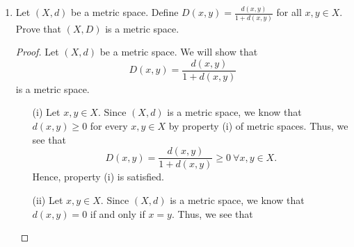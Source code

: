 \documentclass{article}
\begin{document}
\begin{enumerate}
\begin{proof}
\begin{enumerate}
\begin{align*}
                                        &= \max_{x \in [0,1]}| f(x) |  + \max_{x \in [0,1]} | g(x) | \tag{Problem 9-2) of hw1} \\
                                        &= \|f\|_{\infty } + \|g\|_{\infty }.
                \end{align*}
                Thus, the triangle inequality property is satisfied.
        \end{enumerate}
        Since all four properties have been satisfied, we can now conclude that \( \|\cdot\|_{\infty } \) is a norm on the vector space \( X = C[0,1] \). The corresponding metric is the function \( {d}_{\infty }: X \times X \to \R  \) defined by \( {d}_{\infty }(f,g) = \|f - g\|_{\infty } \).
    \end{proof}
    \begin{remark}
        We can appeal to the same methods in the remark of problem 12 to show the triangle inequality for the \( \|\cdot\|_{\infty } \). By definition of maximums, we see that  
        \( | f(x) | \leq \|f\|_{\infty } \) and \( | g(x) | \leq \|g\|_{\infty } \) for all \( x \in [0,1] \). Adding these two inequalities together and using the triangle inequality of the \( | \cdot |  \), we see that
        \[ | f(x) + g(x) |   \leq | f(x)  | + | g(x) |  \leq \|f\|_{\infty } + \|g\|_{\infty } \]
        which holds for all \( x \in [0,1] \). Thus, we see that the set 
        \[  | f(x) + g(x) | : x \in [0,1] \]
        is bounded above by \( \|f\|_{\infty } + \|g\|_{\infty }  \), and so we have
        \[ \|f +g\|_{\infty }  \max_{1 \leq i \leq n}| f(x) + g(x) | \leq \|f\|_{\infty } + \|g\|_{\infty }.  \]
    \end{remark}
\item Let \( (X,d) \) be a metric space. Define \( D(x,y) = \frac{ d(x,y) }{  1 + d(x,y) }  \) for all \( x,y \in X  \). Prove that \( (X,D) \) is a metric space.
    \begin{proof}
    Let \( (X,d) \) be a metric space. We will show that  
    \[  D(x,y) = \frac{ d(x,y) }{  1 + d(x,y) }  \]
    is a metric space. 
    \begin{enumerate}
        \item[(i)] Let \( x,y \in X  \). Since \( (X,d) \) is a metric space, we know that          \( d(x,y) \geq 0  \) for every \( x,y \in X  \) by property (i) of metric spaces. Thus, we see that
            \[  D(x,y) = \frac{ d(x,y)  }{ 1 + d(x,y) } \geq 0 \ \forall x,y \in X. \]
            Hence, property (i) is satisfied.
        \item[(ii)] Let \( x,y \in X  \). Since \( (X,d) \) is a metric space, we know that \( d(x,y) = 0  \) if and only if \( x = y  \). Thus, we see that  

\end{enumerate}
\end{proof}
\end{enumerate}
\end{document}
